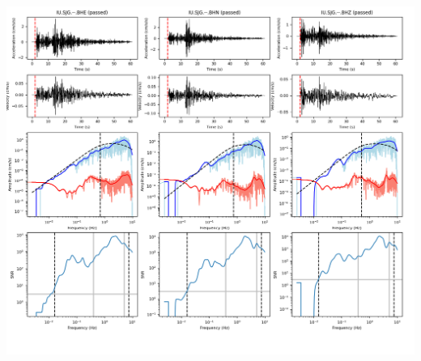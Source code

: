 \documentclass[9pt]{article}
\begin{document}
\includegraphics[height=5.75in]
    {plots/19930801193229_IU.SJG.BH.png}
\end{document}
